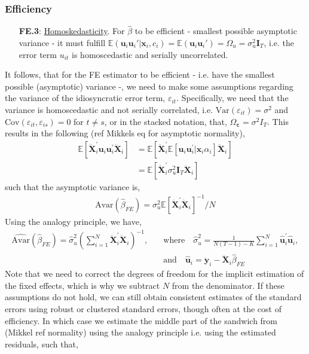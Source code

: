 \subsubsection*{Efficiency}

\begin{itemize}
    \item [\textbf{FE.3}:] \underline{Homoskedasticity}. For $\hat{\beta}$ to be efficient - smallest possible asymptotic variance - it must fulfill $\mathbb{E}(\bm{u}_i \bm{u}_i' | \bm{x}_i, c_i) = \mathbb{E}(\bm{u}_i \bm{u}_i') = \Omega_{u} = \sigma^2_u \bm{I}_T$, i.e. the error term $u_{it}$ is homoscedastic and serially uncorrelated.    
\end{itemize}

It follows, that for the FE estimator to be efficient - i.e. have the smallest possible (asymptotic) variance -, we need to make some assumptions regarding the variance of the idiosyncratic error term, $\varepsilon_{it}$. Specifically, we need that the variance is homoscedastic and not serially correlated, i.e. $\text{Var}(\varepsilon_{it}) = \sigma^2$ and $\text{Cov}(\varepsilon_{it}, \varepsilon_{is}) = 0$ for $t \neq s$, or in the stacked notation, that, $\Omega_{\bm{\varepsilon}} = \sigma^2 I_T$. This results in the following (ref Mikkels eq for asymptotic normality), 
\begin{align*}
    \mathbb{E}\left[ \bm{\ddot{X}}_i^\prime \bm{u}_i \bm{u}_i^\prime \bm{\ddot{X}}_i \right] &= \mathbb{E}\left[ \bm{\ddot{X}}_i^\prime \mathbb{E}[\bm{u}_i \bm{u}_i^\prime | \bm{x}_i \alpha_i]\bm{\ddot{X}}_i \right] \\
    &= \mathbb{E}[\ddot{\bm{X}}_i^\prime \sigma_u^2 \bm{I}_T \bm{\ddot{X}}_i]
\end{align*}
such that the asymptotic variance is,
\begin{align*}
    \text{Avar}(\hat{\beta}_{FE}) = \sigma_u^2 \mathbb{E}[\bm{\ddot{X}}_i^\prime \bm{\ddot{X}}_i]^{-1} / N
\end{align*}
Using the analogy principle, we have, 
\begin{align*}
    \hat{\text{Avar}}(\hat{\beta}_{FE}) = \hat{\sigma}_u^2 \left( \sum_{i=1}^N \bm{\ddot{X}}_i^\prime \bm{\ddot{X}}_i \right)^{-1}, \quad &\text{where} \quad \hat{\sigma}_u^2 = \frac{1}{N(T-1) - K} \sum_{i=1}^N \hat{\bm{u}}_i^\prime \hat{\bm{u}}_i, \\
    &\text{and} \quad \hat{\bm{u}}_i = \bm{\ddot{y}}_i - \bm{\ddot{X}}_i \hat{\beta}_{FE}
\end{align*}
Note that we need to correct the degrees of freedom for the implicit estimation of the fixed effects, which is why we subtract $N$ from the denominator. If these assumptions do not hold, we can still obtain consistent estimates of the standard errors using robust or clustered standard errors, though often at the cost of efficiency. In which case we estimate the middle part of the sandwich from (Mikkel ref normality) using the analogy principle i.e. using the estimated residuals, such that, 

